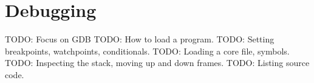 \chapter{Debugging}

TODO: Focus on GDB
TODO: How to load a program.
TODO: Setting breakpoints, watchpoints, conditionals.
TODO: Loading a core file, symbols.
TODO: Inspecting the stack, moving up and down frames.
TODO: Listing source code.

